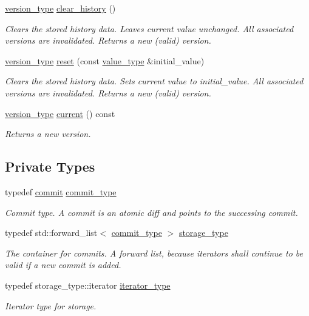 \begin{DoxyCompactItemize}
\hyperlink{classarchived_a75b8e571e7c6aca9432b9aa2ba601c00}{version\+\_\+type} \hyperlink{classarchived_a5af939f79bddf33f8773fcb89016a85d}{clear\+\_\+history} ()
\begin{DoxyCompactList}\small\item\em Clears the stored history data. Leaves current value unchanged. All associated versions are invalidated. Returns a new (valid) version. \end{DoxyCompactList}\item 
\hyperlink{classarchived_a75b8e571e7c6aca9432b9aa2ba601c00}{version\+\_\+type} \hyperlink{classarchived_ae76263bf1bcd3dd0f6023c8142691a6c}{reset} (const \hyperlink{classarchived_a0f6c13c55e504fe3bbfc04f3896e5abc}{value\+\_\+type} \&initial\+\_\+value)
\begin{DoxyCompactList}\small\item\em Clears the stored history data. Sets current value to initial\+\_\+value. All associated versions are invalidated. Returns a new (valid) version. \end{DoxyCompactList}\item 
\hyperlink{classarchived_a75b8e571e7c6aca9432b9aa2ba601c00}{version\+\_\+type} \hyperlink{classarchived_a7b7505259596c1deaff30a9fb7942bb5}{current} () const 
\begin{DoxyCompactList}\small\item\em Returns a new version. \end{DoxyCompactList}\end{DoxyCompactItemize}
\subsection*{Private Types}
\begin{DoxyCompactItemize}
\item 
typedef \hyperlink{classarchived_1_1commit}{commit} \hyperlink{classarchived_a690d4ac871a018e652efb9b0b69aa7ef}{commit\+\_\+type}
\begin{DoxyCompactList}\small\item\em Commit type. A commit is an atomic diff and points to the successing commit. \end{DoxyCompactList}\item 
typedef std\+::forward\+\_\+list$<$ \hyperlink{classarchived_a690d4ac871a018e652efb9b0b69aa7ef}{commit\+\_\+type} $>$ \hyperlink{classarchived_afc884a6d27f4c8fde4d0c2d658f1bc60}{storage\+\_\+type}
\begin{DoxyCompactList}\small\item\em The container for commits. A forward list, because iterators shall continue to be valid if a new commit is added. \end{DoxyCompactList}\item 
typedef storage\+\_\+type\+::iterator \hyperlink{classarchived_ae1e2e3488734f8f0bcd58f5f91f31d52}{iterator\+\_\+type}
\begin{DoxyCompactList}\small\item\em Iterator type for storage. \end{DoxyCompactList}\end{DoxyCompactItemize}
